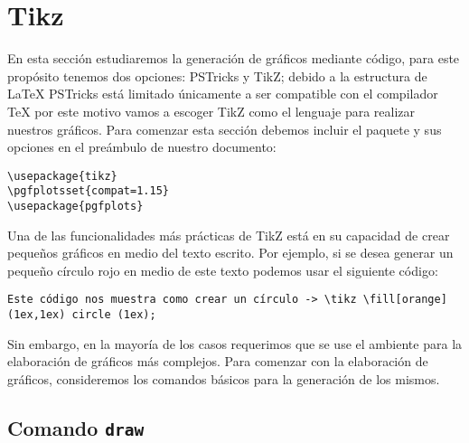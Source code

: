 \documentclass[a4,10pt]{aleph-notas}
\begin{document}
\shorthandoff{<}
\shorthandoff{>}

\encabezado

\informacion

\tableofcontents

\section{Tikz}

En esta sección estudiaremos la generación de gráficos mediante código, para este propósito tenemos dos opciones: PSTricks y TikZ; debido a la estructura de \LaTeX{} PSTricks está limitado únicamente a ser compatible con el compilador \TeX{} por este motivo vamos a escoger TikZ como el lenguaje para realizar nuestros gráficos. Para comenzar esta sección debemos incluir el paquete y sus opciones en el preámbulo de nuestro documento:

\begin{lstlisting}[frame=single]
\usepackage{tikz}
\pgfplotsset{compat=1.15}
\usepackage{pgfplots}
\end{lstlisting}


Una de las funcionalidades más prácticas de TikZ está en su capacidad de crear pequeños gráficos en medio del texto escrito. Por ejemplo, si se desea generar un pequeño círculo rojo en medio de este texto podemos usar el siguiente código:

\begin{lstlisting}[frame=single]
Este código nos muestra como crear un círculo -> \tikz \fill[orange] (1ex,1ex) circle (1ex);
\end{lstlisting}

\begin{center}
{ \fboxsep 12pt
 }
\end{center}

Sin embargo, en la mayoría de los casos requerimos que se use el ambiente para la elaboración de gráficos más complejos. Para comenzar con la elaboración de gráficos, consideremos los comandos básicos para la generación de los mismos. 

\subsection{Comando \texttt{draw}}
\end{document}

